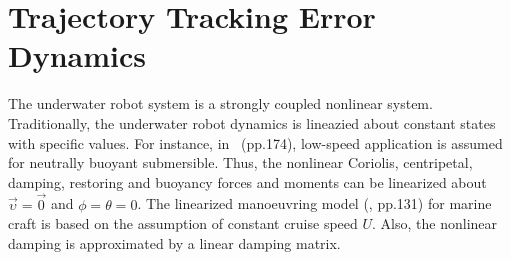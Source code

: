 \chapter{Trajectory Tracking Error Dynamics}

The underwater robot system is a strongly coupled nonlinear system. Traditionally, the underwater robot dynamics is lineazied about constant states with specific values. For instance, in~\cite{F2011} (pp.174), low-speed application is assumed for neutrally buoyant submersible. Thus, the nonlinear Coriolis, centripetal, damping, restoring and buoyancy forces and moments can be linearized about $\vec{\upsilon}=\vec{0}$ and $\phi=\theta=0$. The linearized manoeuvring model (\cite{F2011}, pp.131)  for marine craft is based on the assumption of constant cruise speed $U$. Also, the nonlinear damping is approximated by a linear damping matrix. 

